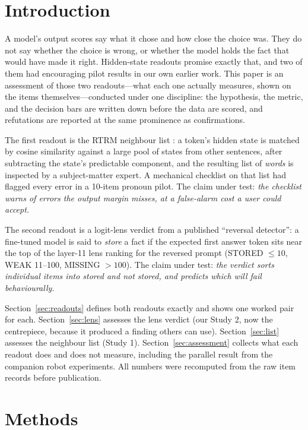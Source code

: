 \documentclass[11pt]{article}
\begin{document}
\section{Introduction}

A model's output scores say what it chose and how close the choice was.
They do not say whether the choice is wrong, or whether the model
holds the fact that would have made it right. Hidden-state readouts
promise exactly that, and two of them had encouraging pilot results in
our own earlier work. This paper is an assessment of those two
readouts---what each one actually measures, shown on the items
themselves---conducted under one discipline: the hypothesis, the
metric, and the decision bars are written down before the data are
scored, and refutations are reported at the same prominence as
confirmations.

The first readout is the RTRM neighbour list \cite{nussbaum_book}: a
token's hidden state is matched by cosine similarity against a large
pool of states from other sentences, after subtracting the state's
predictable component, and the resulting list of \emph{words} is
inspected by a subject-matter expert. A mechanical checklist on that
list had flagged every error in a 10-item pronoun pilot. The claim
under test: \emph{the checklist warns of errors the output margin
misses, at a false-alarm cost a user could accept.}

The second readout is a logit-lens verdict \cite{logitlens} from a
published ``reversal detector'': a fine-tuned model is said to
\emph{store} a fact if the expected first answer token sits near the
top of the layer-11 lens ranking for the reversed prompt (STORED
$\le 10$, WEAK 11--100, MISSING $> 100$). The claim under test:
\emph{the verdict sorts individual items into stored and not stored,
and predicts which will fail behaviourally.}

Section~\ref{sec:readouts} defines both readouts exactly and shows one
worked pair for each. Section~\ref{sec:lens} assesses the lens verdict
(our Study 2, now the centrepiece, because it produced a finding
others can use). Section~\ref{sec:list} assesses the neighbour list
(Study 1). Section~\ref{sec:assessment} collects what each readout
does and does not measure, including the parallel result from the
companion robot experiments. All numbers were recomputed from the raw
item records before publication.

\section{Methods}
\label{sec:methods}
\end{document}
